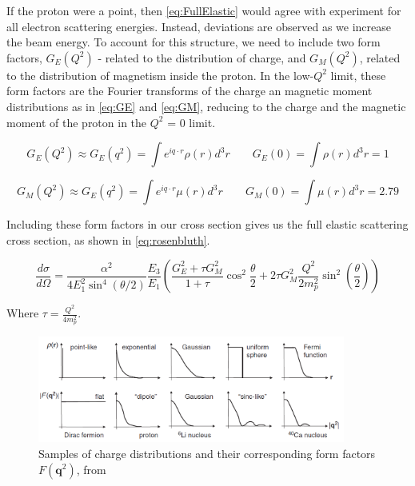             \indent If the proton were a point, then \eqref{eq:FullElastic} would agree with experiment for all electron scattering energies. Instead, deviations are observed as we increase the beam energy. To account for this structure, we need to include two form factors, $G_E(Q^2)$ - related to the distribution of charge, and $G_M(Q^2)$, related to the distribution of magnetism inside the proton. In the low-$Q^2$ limit, these form factors are the Fourier transforms of the charge an magnetic moment distributions as in \eqref{eq:GE} and \ref{eq:GM}, reducing to the charge and the magnetic moment of the proton in the $Q^2$ = 0 limit. %

        \begin{equation}\label{eq:GE}
             G_E(Q^2) \approx G_E(q^2) = \int e^{iq\cdot r} \rho (r) d^3r  \quad \quad    G_E(0) = \int  \rho (r) d^3r = 1
        \end{equation}

        \begin{equation}\label{eq:GM}
             G_M(Q^2) \approx G_E(q^2) = \int e^{iq\cdot r} \mu (r) d^3r  \quad \quad  G_M(0) = \int  \mu (r) d^3r = 2.79
        \end{equation}
        
        
        Including these form factors in our cross section gives us the full elastic scattering cross section, as shown in \eqref{eq:rosenbluth}.
                
        \begin{equation}\label{eq:rosenbluth}
            \frac{d\sigma}{d\Omega} = \frac{\alpha^2}{4E_1^2\sin^4{(\theta/2)}}\frac{E_3}{E_1}\left( \frac{G_E^2+\tau G_M^2}{1+\tau} \cos^2{\frac{\theta}{2}}+2\tau G_M^2\frac{Q^2}{2m_p^2}\sin^2(\frac{\theta}{2})\right)
        \end{equation}
       
        Where $\tau = \frac{Q^2}{4m_p^2}$.
        

        \begin{figure}[H]\label{fig:formfactors}
            \centering
            \includegraphics[width=0.9\textwidth]{Chapters/Ch1-Intro/Ch1-Sec1-Background/pics/intro/possibleformfactors.png}
            \caption[Fourier Transforms of Charge Distributions]{Samples of charge distributions and their corresponding form factors $F(\textbf{q}^2)$, from \parencite{Thomson2013ModernPhysics} }
        \end{figure}
        

